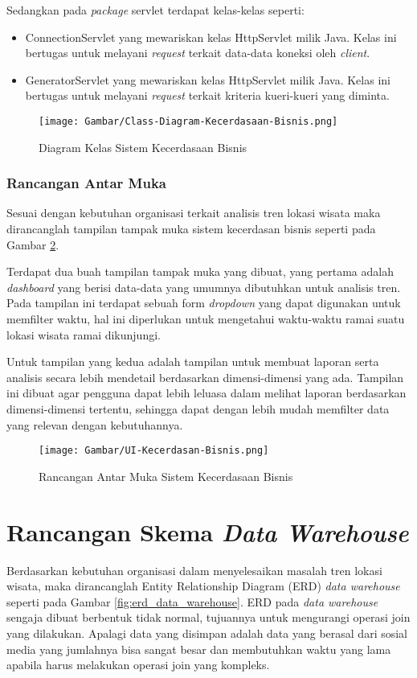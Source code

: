 Sedangkan pada \textit{package} servlet terdapat kelas-kelas seperti:
\begin{itemize}
	\item ConnectionServlet yang mewariskan kelas HttpServlet milik Java. Kelas ini bertugas untuk melayani \textit{request} terkait data-data koneksi oleh \textit{client}.
	\item GeneratorServlet yang mewariskan kelas HttpServlet milik Java. Kelas ini bertugas untuk melayani \textit{request} terkait kriteria kueri-kueri yang diminta.
\end{itemize}

\begin{figure}[H]
	\centering
	\texttt{[image: Gambar/Class-Diagram-Kecerdasaan-Bisnis.png]}
	\caption[Diagram Kelas Sistem Kecerdasaan Bisnis]{Diagram Kelas Sistem Kecerdasaan Bisnis} 
	\label{fig:bi_kelas}
\end{figure}

\subsubsection{Rancangan Antar Muka}
Sesuai dengan kebutuhan organisasi terkait analisis tren lokasi wisata maka dirancanglah tampilan tampak muka sistem kecerdasan bisnis seperti pada Gambar \ref{fig:bi_ui}. 

Terdapat dua buah tampilan tampak muka yang dibuat, yang pertama adalah \textit{dashboard} yang berisi data-data yang umumnya dibutuhkan untuk analisis tren. Pada tampilan ini terdapat sebuah form \textit{dropdown} yang dapat digunakan untuk memfilter waktu, hal ini diperlukan untuk mengetahui waktu-waktu ramai suatu lokasi wisata ramai dikunjungi. 

Untuk tampilan yang kedua adalah tampilan untuk membuat laporan serta analisis secara lebih mendetail berdasarkan dimensi-dimensi yang ada. Tampilan ini dibuat agar pengguna dapat lebih leluasa dalam melihat laporan berdasarkan dimensi-dimensi tertentu, sehingga dapat dengan lebih mudah memfilter data yang relevan dengan kebutuhannya.

\begin{figure}[H]
	\centering
	\texttt{[image: Gambar/UI-Kecerdasan-Bisnis.png]}
	\caption[Rancangan Antar Muka Sistem Kecerdasaan Bisnis]{Rancangan Antar Muka Sistem Kecerdasaan Bisnis} 
	\label{fig:bi_ui}
\end{figure}

\section{Rancangan Skema \textit{Data Warehouse}}
Berdasarkan kebutuhan organisasi dalam menyelesaikan masalah tren lokasi wisata, maka dirancanglah Entity Relationship Diagram (ERD) \textit{data warehouse} seperti pada Gambar \ref{fig:erd_data_warehouse}. ERD pada \textit{data warehouse} sengaja dibuat berbentuk tidak normal, tujuannya untuk mengurangi operasi join yang dilakukan. Apalagi data yang disimpan adalah data yang berasal dari sosial media yang jumlahnya bisa sangat besar dan membutuhkan waktu yang lama apabila harus melakukan operasi join yang kompleks.

